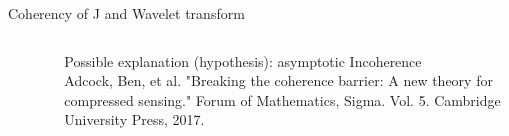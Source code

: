 \documentclass[12pt]{beamer}
\begin{document}
\begin{frame}{Coherency of J and Wavelet transform}
\begin{columns}
\begin{column}{0.6\textwidth}
\begin{figure}
   \\
\end{figure}
\end{column}
\begin{column}{0.4\textwidth}
Possible explanation (hypothesis): asymptotic Incoherence \\
{\color{gray}Adcock, Ben, et al. "Breaking the coherence barrier: A new theory for compressed sensing." Forum of Mathematics, Sigma. Vol. 5. Cambridge University Press, 2017.}
\end{column}
\end{columns}
\end{frame}
\end{document}
